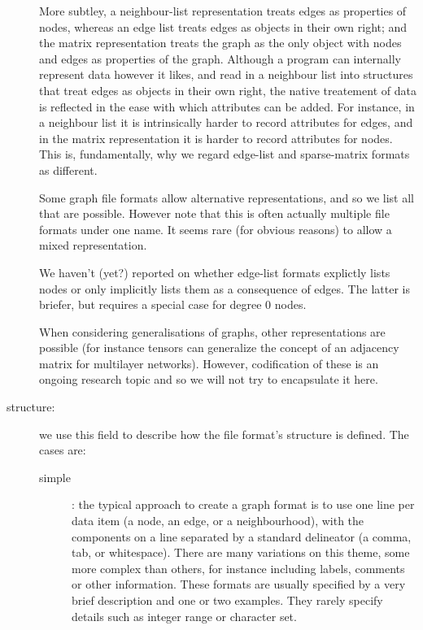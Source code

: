 \documentclass{sig-alternate}
\begin{document}
\begin{description}
  More subtley, a neighbour-list representation treats edges as
  properties of nodes, whereas an edge list treats edges as objects in
  their own right; and the matrix representation treats the graph as
  the only object with nodes and edges as properties of the graph.
  Although a program can internally represent data however it likes,
  and read in a neighbour list into structures that treat edges as
  objects in their own right, the native treatement of data is
  reflected in the ease with which attributes can be added. For
  instance, in a neighbour list it is intrinsically harder to record
  attributes for edges, and in the matrix representation it is harder
  to record attributes for nodes. This is, fundamentally, why we regard
  edge-list and sparse-matrix formats as different.

  Some graph file formats allow alternative representations, and so we
  list all that are possible. However note that this is often actually
  multiple file formats under one name. It seems rare (for obvious
  reasons) to allow a mixed representation.

  We haven't (yet?) reported on whether edge-list formats explictly
  lists nodes or only implicitly lists them as a consequence of
  edges. The latter is briefer, but requires a special case for degree
  0 nodes.
 
  When considering generalisations of graphs, other representations
  are possible (for instance tensors can generalize the concept of an
  adjacency matrix for multilayer networks). However, codification of
  these is an ongoing research topic \cite{kivela:_multil} and so we
  will not try to encapsulate it here.

\item[structure:] we use this field to describe how the file format's
  structure is defined. The cases are: 
  \begin{description}

  \item[simple]: the typical approach to create a graph format is to
    use one line per data item (a node, an edge, or a neighbourhood),
    with the components on a line separated by a standard delineator
    (a comma, tab, or whitespace). There are many variations on this
    theme, some more complex than others, for instance including
    labels, comments or other information. These formats are usually
    specified by a very brief description and one or two
    examples. They rarely specify details such as integer range or
    character set.


\end{description}
\end{description}
\end{document}
